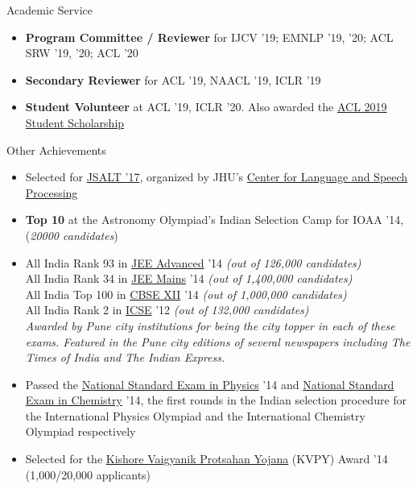 \documentclass{resume} %
\begin{document}
\begin{rSection}{Academic Service}
\vspace*{0.1in}
\begin{itemize}[leftmargin=*]
\item \textbf{Program Committee / Reviewer} for IJCV '19; EMNLP '19, '20; ACL SRW '19, '20; ACL '20
\item \textbf{Secondary Reviewer} for ACL '19, NAACL '19, ICLR '19
\item \textbf{Student Volunteer} at ACL '19, ICLR '20. Also awarded the \href{http://www.acl2019.org/EN/student-scholarship-applications-volunteers.xhtml}{ACL 2019 Student Scholarship}
\end{itemize}
\end{rSection}

\begin{rSection}{Other Achievements}
\begin{itemize}[leftmargin=*]
\item Selected for \href{https://www.lti.cs.cmu.edu/2017-jsalt-undergraduate}{JSALT '17}, organized by JHU's \href{https://www.clsp.jhu.edu/}{Center for Language and Speech Processing}\footnotemark[2] 
\item \textbf{Top 10} at the Astronomy Olympiad's Indian Selection Camp for IOAA '14, (\textit{20000 candidates})
\item All India Rank 93 in \href{https://en.wikipedia.org/wiki/Joint_Entrance_Examination}{JEE Advanced} '14 \textit{(out of 126,000 candidates)} \\ All India Rank 34 in \href{https://en.wikipedia.org/wiki/Joint_Entrance_Examination}{JEE Mains} '14 \textit{(out of 1,400,000 candidates)} \\
All India Top 100 in \href{https://en.wikipedia.org/wiki/Central_Board_of_Secondary_Education}{CBSE XII} '14 \textit{(out of 1,000,000 candidates)} \\
All India Rank 2 in \href{https://en.wikipedia.org/wiki/Indian_Certificate_of_Secondary_Education}{ICSE} '12 \textit{(out of 132,000 candidates)}\\
{\color{red} \textit{Awarded by Pune city institutions for being the city topper in each of these exams. Featured in the Pune city editions of several newspapers including The Times of India and The Indian Express.}}
\item Passed the \href{https://www.iapt.org.in/exams/nse/nsep.html}{National Standard Exam in Physics} '14 and \href{https://www.iapt.org.in/exams/nse/nsec-b-a-js.html}{National Standard Exam in Chemistry} '14, the first rounds in the Indian selection procedure for the International Physics Olympiad and the International Chemistry Olympiad respectively
\item Selected for the \href{http://www.kvpy.iisc.ernet.in/main/index.htm}{Kishore Vaigyanik Protsahan Yojana} (KVPY) Award '14 (1,000/20,000 applicants)
\end{itemize}
\end{rSection}
\end{document}
